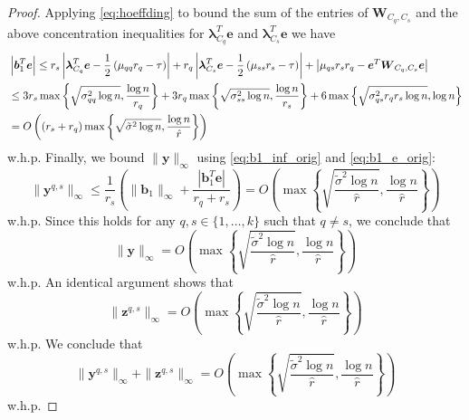 \documentclass[twoside,11pt]{article}
\DeclareMathOperator{\pr}{Pr}
\newcommand{\e}{\bs {e}}
\newcommand{\bs}{\boldsymbol}
\newcommand{\0}{\bs{0}}
\newcommand{\rbra}[1]{\ensuremath{\left( #1 \right)}} %
\newcommand{\bra}[1]{\ensuremath{\left\{ #1 \right\}}} %
\begin{document}
{\begin{proof}
Applying \eqref{eq:hoeffding} to bound the sum of the entries of
$\bs{W}_{C_q,C_s}$ and the above concentration inequalities
for $\bs{\lambda}_{C_q}^T \e$ and $\bs{\lambda}_{C_s}^T \e$
we have
\begin{align}
	& \left|\bs{b}_1^T \bs{e}\right|
		\leq r_s \left|\bs{\lambda}_{C_q}^T \bs{e} - \frac{1}
		{2}\left(\mu_{qq} r_q - \tau \right)\right|
		+ r_q\left|\bs{\lambda}_{C_s}^T \bs{e}
		- \frac{1}{2}\left(\mu_{ss} r_s - \tau\right)\right|
		+ \left|\mu_{qs} r_s r_q - \bs{e}^T \bs{W}_{C_q,C_s}\bs{e}\right|
		\notag \\
		& \leq 3 r_s \max\bra{ \sqrt{\sigma_{qq}^2 \log n},
			\frac{\log n}{r_q} }
			+ 3 r_q \max\bra{ \sqrt{\sigma_{ss}^2 \log n},
			\frac{\log n}{r_s} }
			+  6 \max \bra{ \sqrt{\sigma_{qs}^2 r_q r_s \log n}, \log n}
		\notag \\
		& = O \rbra{ (r_s + r_q) \max\bra{ \sqrt{\tilde \sigma^2 \log n},
			\frac{\log n}{\hat r} }  }\label{eq:b1_e_orig}
\end{align}
w.h.p.
Finally, we bound $\|\bs{y}\|_{\infty}$  using \eqref{eq:b1_inf_orig} and \eqref{eq:b1_e_orig}:
$$
	\|\bs{y}^{q,s}\|_{\infty}
	\leq \frac{1}{r_s}\left( \|\bs{b}_1\|_{\infty}
		+ \frac{|\bs{b}_1^T \bs{e}|}{r_q +r_s}\right)
	= O \rbra{ \max \bra{  \sqrt{ \frac{ \tilde{\sigma}^2 \log n}{\hat{r}} },
		\frac{ \log n}{\hat{r}} } }
$$
w.h.p. Since this holds for any $q,s \in\{1,\dots,k\}$ such that $q \neq s$, we conclude that
\begin{equation}
\label{eq:y_bound_orig}
\|\bs{y}\|_{\infty} = O \rbra{ \max \bra{  \sqrt{ \frac{ \tilde{\sigma}^2 \log n}{\hat{r}} },
		\frac{ \log n}{\hat{r}} } }
\end{equation}
w.h.p.
An identical argument shows that
\begin{equation}
\label{eq:z_bound_orig}
	\|\bs{z}^{q,s}\|_{\infty}
	= O \rbra{ \max \bra{  \sqrt{ \frac{ \tilde{\sigma}^2 \log n}{\hat{r}} },
		\frac{ \log n}{\hat{r}} } }
\end{equation}
w.h.p.
We conclude that
\begin{equation}
\label{eq:lemma42_known_c}
	\|\bs{y}^{q,s}\|_{\infty} +  \|\bs{z}^{q,s}\|_{\infty}
	= O \rbra{ \max \bra{  \sqrt{ \frac{ \tilde{\sigma}^2 \log n}{\hat{r}} },
		\frac{ \log n}{\hat{r}} } }
\end{equation}
w.h.p.
\end{proof}

}
\end{document}
